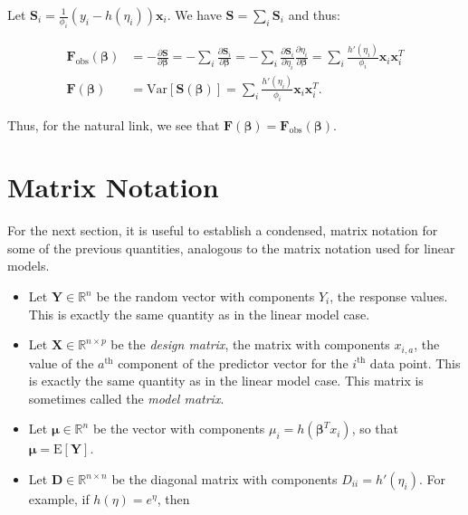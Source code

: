 \documentclass[
  12pt,
]{book}
\begin{document}
Let \(\displaystyle \boldsymbol{S}_i = \frac{1}{\phi_i} (y_i - h(\eta_i))\boldsymbol{x}_i\). We have \(\boldsymbol{S} = \sum_i \boldsymbol{S}_i\) and thus:

\begin{align}
  \boldsymbol{F}_{\text{obs}}(\boldsymbol{\beta}) & = - \frac{\partial \boldsymbol{S}}{\partial \boldsymbol{\beta}} = - \sum_i \frac{\partial \boldsymbol{S}_i}{\partial \boldsymbol{\beta}} = - \sum_i \frac{\partial \boldsymbol{S}_i}{\partial \eta_i} \frac{\partial \eta_i}{\partial \boldsymbol{\beta}} = \sum_i \frac{h'(\eta_i)}{\phi_i} \boldsymbol{x}_i\boldsymbol{x}_i^T \\
  \boldsymbol{F}(\boldsymbol{\beta}) & = {\mathrm{Var}}[\boldsymbol{S}(\boldsymbol{\beta})] = \sum_i \frac{h'(\eta_i)}{\phi_i}\boldsymbol{x}_i\boldsymbol{x}_i^T .
\end{align}

Thus, for the natural link, we see that \(\boldsymbol{F}(\boldsymbol{\beta}) = \boldsymbol{F}_{\text{obs}}(\boldsymbol{\beta})\).

\section{Matrix Notation}\label{matrix-notation}

For the next section, it is useful to establish a condensed, matrix notation for some of the previous quantities, analogous to the matrix notation used for linear models.

\begin{itemize}
\item
  Let \(\boldsymbol{Y}\in{\mathbb R}^{n}\) be the random vector with components \(Y_{i}\), the response values. This is exactly the same quantity as in the linear model case.
\item
  Let \(\boldsymbol{X}\in{\mathbb R}^{n\times p}\) be the \emph{design matrix}, the matrix with components \(x_{i, a}\), the value of the \(a^{\text{th}}\) component of the predictor vector for the \(i^{\text{th}}\) data point. This is exactly the same quantity as in the linear model case. This matrix is sometimes called the \emph{model matrix}.
\item
  Let \(\boldsymbol{\mu}\in{\mathbb R}^{n}\) be the vector with components \(\mu_{i} = h(\boldsymbol{\beta}^{T}x_{i})\), so that \(\boldsymbol{\mu} = {\mathrm E}[\boldsymbol{Y}]\).
\item
  Let \(\boldsymbol{D}\in {\mathbb R}^{n\times n}\) be the diagonal matrix with components \(D_{ii} = h'(\eta_{i})\). For example, if \(h(\eta) = e^{\eta}\), then
\end{itemize}
\end{document}
